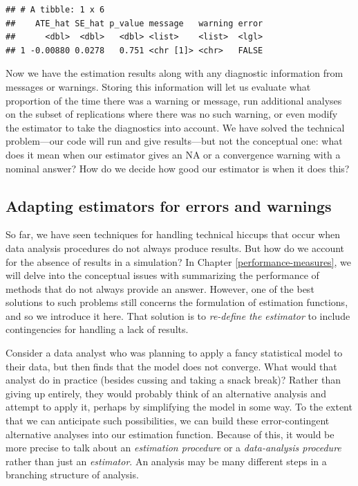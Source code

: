 \documentclass[
]{book}
\begin{document}
\begin{verbatim}
## # A tibble: 1 x 6
##    ATE_hat SE_hat p_value message   warning error
##      <dbl>  <dbl>   <dbl> <list>    <list>  <lgl>
## 1 -0.00880 0.0278   0.751 <chr [1]> <chr>   FALSE
\end{verbatim}

Now we have the estimation results along with any diagnostic information from messages or warnings.
Storing this information will let us evaluate what proportion of the time there was a warning or message, run additional analyses on the subset of replications where there was no such warning, or even modify the estimator to take the diagnostics into account.
We have solved the technical problem---our code will run and give results---but not the conceptual one: what does it mean when our estimator gives an NA or a convergence warning with a nominal answer?
How do we decide how good our estimator is when it does this?

\subsection{Adapting estimators for errors and warnings}\label{adapting-for-errors}

So far, we have seen techniques for handling technical hiccups that occur when data analysis procedures do not always produce results.
But how do we account for the absence of results in a simulation?
In Chapter \ref{performance-measures}, we will delve into the conceptual issues with summarizing the performance of methods that do not always provide an answer.
However, one of the best solutions to such problems still concerns the formulation of estimation functions, and so we introduce it here.
That solution is to \emph{re-define the estimator} to include contingencies for handling a lack of results.

Consider a data analyst who was planning to apply a fancy statistical model to their data, but then finds that the model does not converge.
What would that analyst do in practice (besides cussing and taking a snack break)?
Rather than giving up entirely, they would probably think of an alternative analysis and attempt to apply it, perhaps by simplifying the model in some way.
To the extent that we can anticipate such possibilities, we can build these error-contingent alternative analyses into our estimation function.
Because of this, it would be more precise to talk about an \emph{estimation procedure} or a \emph{data-analysis procedure} rather than just an \emph{estimator}.
An analysis may be many different steps in a branching structure of analysis.
\end{document}
